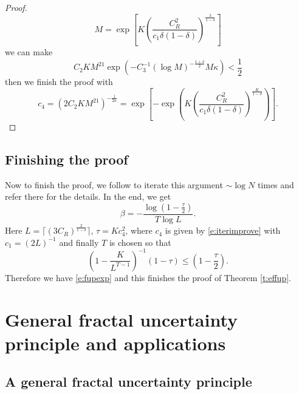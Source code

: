 \documentclass[reqno,12pt,letterpaper]{amsart}
\numberwithin{equation}{section}
\numberwithin{prop}{section}
\begin{document}
\begin{proof}
\begin{equation*}
M=\exp\left[K\left(\frac{C_R^2}{c_1\delta(1-\delta)}\right)^{\frac{3}{1-\delta}}\right]
\end{equation*} 
we can make
\begin{equation*}
C_2KM^{21}\exp(-C_3^{-1}(\log M)^{-\frac{1+\delta}{2}}M\kappa)<\frac{1}{2}
\end{equation*}
then we finish the proof with 
\begin{equation*}
c_4=(2C_2KM^{21})^{-\frac{1}{2\kappa}}
=\exp\left[-\exp\left(K\left(\frac{C_R^2}{c_1\delta(1-\delta)}\right)^{\frac{K}{1-\delta}}\right)\right].
\end{equation*}
\end{proof}

\subsection{Finishing the proof}

Now to finish the proof, we follow \cite[\S 3.4]{fullgap} to iterate this argument $\sim\log N$ times and refer there for the details. In the end, we get
\begin{equation*}
\beta=-\frac{\log(1-\frac{\tau}{2})}{T\log L}.
\end{equation*}
Here $L=\lceil(3C_R)^{\frac{2}{1-\delta}}\rceil$, $\tau=Kc_4^2$, where $c_4$ is given by \eqref{e:iterimprove} with $c_1=(2L)^{-1}$ and finally $T$ is chosen so that 
\begin{equation*}
\left(1-\frac{K}{L^{T-1}}\right)^{-1}(1-\tau)\leq(1-\frac{\tau}{2}).
\end{equation*}
Therefore we have \eqref{e:fupexp} and this finishes the proof of Theorem \ref{t:effup}.


\section{General fractal uncertainty principle and applications}
\label{s:application}


\subsection{A general fractal uncertainty principle}
\label{s:generalfup}
\end{document}
